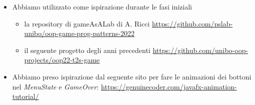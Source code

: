 \documentclass[a4paper,12pt]{report}
\begin{document}


\begin{itemize}
	\item Abbiamo utilizzato come ispirazione durante le fasi iniziali
    \begin{itemize}
        \item la repository di gameAsALab di A. Ricci \url{https://github.com/pslab-unibo/oop-game-prog-patterns-2022}
        \item il seguente progetto degli anni precedenti \url{https://github.com/unibo-oop-projects/oop22-t2s-game}
    \end{itemize}
    \item Abbiamo preso ispirazione dal seguente sito per fare le animazioni dei bottoni nel \emph{MenuState} e \emph{GameOver}: \url{https://genuinecoder.com/javafx-animation-tutorial/}
\end{itemize}
\end{document}
